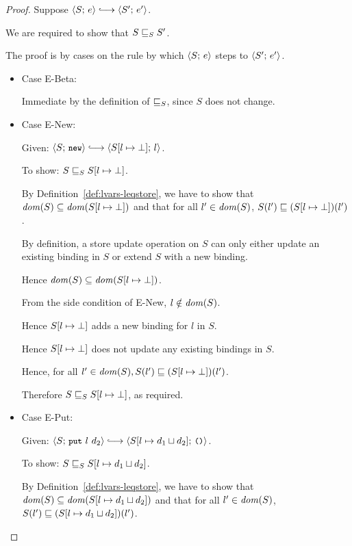 \begin{proof}
  Suppose $\config{S}{e} \parstepsto \config{S'}{e'}$.

  We are required to show that $S \sqsubseteq_S S'$.

  The proof is by cases on the rule by which $\langle S;\, e \rangle$ steps to
  $\langle S';\, e' \rangle$.

  \begin{itemize}
  \item Case {\sc E-Beta}:

    Immediate by the definition of $ \sqsubseteq_S $, since $S$ does not
    change.

  \item Case {\sc E-New}:

    Given: $\config{S}{\NEW} \parstepsto
    \config{\extSRaw{S}{l}{\bot}}{l}$.

    To show: $S \sqsubseteq_S S[l \mapsto \bot]$.

    By Definition~\ref{def:lvars-leqstore}, we have to show that
    $\mathit{dom}(S) \subseteq \mathit{dom}(S[l \mapsto \bot])$ and that for all
    $l' \in \mathit{dom}(S)$, $S(l') \sqsubseteq (S[l \mapsto \bot])(l')$.

    By definition, a store update operation on $S$ can only either
    update an existing binding in $S$ or extend $S$ with a new
    binding.

    Hence $\mathit{dom}(S) \subseteq \mathit{dom}(S[l \mapsto \bot])$.

    From the side condition of {\sc E-New}, $l \notin \mathit{dom}(S)$.

    Hence $S[l \mapsto \bot]$ adds a new binding for $l$ in $S$.

    Hence $S[l \mapsto \bot]$ does not update any existing
    bindings in $S$.

    Hence, for all $l' \in \mathit{dom}(S), S(l') \sqsubseteq
    (S[l \mapsto \bot])(l')$.

    Therefore $S \sqsubseteq_S S[l \mapsto \bot]$, as
    required.

  \item Case {\sc E-Put}:

    Given: $\config{S}{\putexp{l}{d_2}} \parstepsto
    \config{\extSRaw{S}{l}{\userlub{d_1}{d_2}}}{\unit}$.

    To show: $S \sqsubseteq_S S[l \mapsto d_1 \sqcup d_2]$.

    By Definition~\ref{def:lvars-leqstore}, we have to show that
    $\mathit{dom}(S) \subseteq \mathit{dom}(S[l \mapsto d_1 \sqcup d_2])$ and
    that for all $l' \in \mathit{dom}(S)$, $S(l') \sqsubseteq
    (S[l \mapsto d_1 \sqcup d_2])(l')$.


\end{itemize}
\end{proof}

